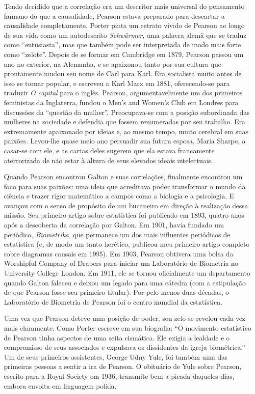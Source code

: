 \documentclass[11pt,a5paper,twoside]{book}
\begin{document}
Tendo decidido que a correlação era um descritor mais universal do pensamento humano do que a causalidade, Pearson estava preparado para descartar a causalidade completamente. Porter pinta um retrato vívido de Pearson ao longo de sua vida como um autodescrito \textit{Schwärmer}, uma palavra alemã que se traduz como “entusiasta”, mas que também pode ser interpretada de modo mais forte como “zelote”. Depois de se formar em Cambridge em 1879, Pearson passou um ano no exterior, na Alemanha, e se apaixonou tanto por sua cultura que prontamente mudou seu nome de Carl para Karl. Era socialista muito antes de isso se tornar popular, e escreveu a Karl Marx em 1881, oferecendo-se para traduzir \textit{O capital} para o inglês. Pearson, argumentavelmente um dos primeiros feministas da Inglaterra, fundou o Men’s and Women’s Club em Londres para discussões da “questão da mulher”. Preocupava-se com a posição subordinada das mulheres na sociedade e defendia que fossem remuneradas por seu trabalho. Era extremamente apaixonado por ideias e, ao mesmo tempo, muito cerebral em suas paixões. Levou-lhe quase meio ano persuadir sua futura esposa, Maria Sharpe, a casar-se com ele, e as cartas deles sugerem que ela estava francamente aterrorizada de não estar à altura de seus elevados ideais intelectuais.

Quando Pearson encontrou Galton e suas correlações, finalmente encontrou um foco para suas paixões: uma ideia que acreditava poder transformar o mundo da ciência e trazer rigor matemático a campos como a biologia e a psicologia. E avançou com o senso de propósito de um bucaneiro em direção à realização dessa missão. Seu primeiro artigo sobre estatística foi publicado em 1893, quatro anos após a descoberta da correlação por Galton. Em 1901, havia fundado um periódico, \textit{Biometrika}, que permanece um dos mais influentes periódicos de estatística (e, de modo um tanto herético, publicou meu primeiro artigo completo sobre diagramas causais em 1995). Em 1903, Pearson obtivera uma bolsa da Worshipful Company of Drapers para iniciar um Laboratório de Biometria no University College London. Em 1911, ele se tornou oficialmente um departamento quando Galton faleceu e deixou um legado para uma cátedra (com a estipulação de que Pearson fosse seu primeiro titular). Por pelo menos duas décadas, o Laboratório de Biometria de Pearson foi o centro mundial da estatística.

Uma vez que Pearson deteve uma posição de poder, seu zelo se revelou cada vez mais claramente. Como Porter escreve em sua biografia: “O movimento estatístico de Pearson tinha aspectos de uma seita cismática. Ele exigia a lealdade e o compromisso de seus associados e expulsava os dissidentes da igreja biométrica.” Um de seus primeiros assistentes, George Udny Yule, foi também uma das primeiras pessoas a sentir a ira de Pearson. O obituário de Yule sobre Pearson, escrito para a Royal Society em 1936, transmite bem a picada daqueles dias, embora envolta em linguagem polida.
\end{document}
